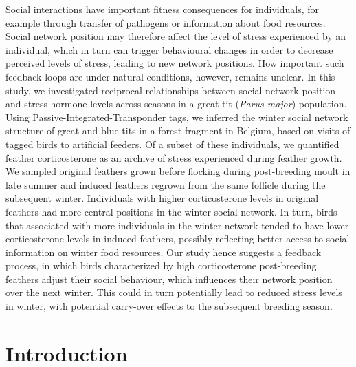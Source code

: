 \documentclass[10pt, twoside]{book} %
\begin{document}
Social interactions have important fitness consequences for individuals, for example through transfer of pathogens or information about food resources. Social network position may therefore affect the level of stress experienced by an individual, which in turn can trigger behavioural changes in order to decrease perceived levels of stress, leading to new network positions. How important such feedback loops are under natural conditions, however, remains unclear. In this study, we investigated reciprocal relationships between social network position and stress hormone levels across seasons in a great tit (\textit{Parus major}) population. Using Passive-Integrated-Transponder tags, we inferred the winter social network structure of great and blue tits in a forest fragment in Belgium, based on visits of tagged birds to artificial feeders. Of a subset of these individuals, we quantified feather corticosterone as an archive of stress experienced during feather growth. We sampled original feathers grown before flocking during post-breeding moult in late summer and induced feathers regrown from the same follicle during the subsequent winter. Individuals with higher corticosterone levels in original feathers had more central positions in the winter social network. In turn, birds that associated with more individuals in the winter network tended to have lower corticosterone levels in induced feathers, possibly reflecting better access to social information on winter food resources. Our study hence suggests a feedback process, in which birds characterized by high corticosterone post-breeding feathers adjust their social behaviour, which influences their network position over the next winter. This could in turn potentially lead to reduced stress levels in winter, with potential carry-over effects to the subsequent breeding season.
\clearpage
	
	\section{Introduction}
	
\end{document}
